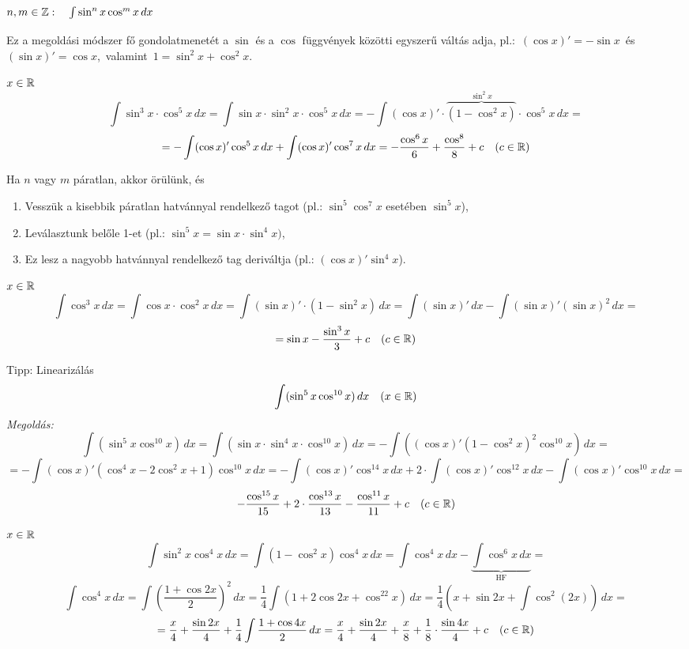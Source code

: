 \documentclass[a4paper,11.5pt]{article}
\begin{document}
	\subsubsection{$n,m\in\mathbb{Z}:\quad \int\sin^n x\cos^mx\,dx$\quad {}\quad}
	\begin{note}
		Ez a megoldási módszer fő gondolatmenetét a $\sin$ és a $\cos$ függvények közötti egyszerű váltás adja, pl.:\, $(\cos x)'=-\sin x$ \,és\, $(\sin x)'=\cos x$, \,valamint \,$1=\sin^2x + \cos^2x$.
	\end{note}
	\begin{task}$x\in\mathbb{R}$
		\[ \int \sin^3x\cdot\cos^5x\,dx=\int\sin x\cdot\sin^2x\cdot\cos^5x\,dx=-\int(\cos x)'\cdot\overbrace{(1-\cos^2 x)}^{\sin^2x}\cdot\cos^5x\,dx=\]
		\[=-\int(\cos x)'\cos^5x\,dx+\int(\cos x)'\cos^7x\,dx=-\frac{\cos^6x}{6}+\frac{\cos^8}{8}+c\quad (c\in\mathbb{R}) \]
	\end{task}
	\begin{note}
		Ha $n$ vagy $m$ páratlan, akkor örülünk, és 
		\begin{enumerate}
			\item Vesszük a kisebbik páratlan hatvánnyal rendelkező tagot (pl.: $\sin^5\cos^7x$ esetében $\sin^5x$),
			\item Leválasztunk belőle 1-et (pl.: $\sin^5x = \sin x\cdot\sin^4 x)$,
			\item Ez lesz a nagyobb hatvánnyal rendelkező tag deriváltja (pl.: $(\cos x)'\sin^4 x$).
		\end{enumerate}
		
	\end{note}
	\begin{task}$x\in\mathbb{R}$
		\[ \int\cos^3x\,dx=\int\cos x\cdot\cos^2x\,dx=\int(\sin x)'\cdot(1-\sin^2x)\,dx=\int(\sin x)'\,dx-\int(\sin x)'(\sin x)^2\,dx=\]
		\[=\sin x-\frac{\sin^3x}{3}+c\quad (c\in\mathbb{R}) \]
	\end{task}
	\begin{exercise} Tipp: Linearizálás 
		\[ \int(\sin^5x\cos^{10}x)\,dx\quad (x\in\mathbb{R}) \]
		\textit{Megoldás:}
		\[ \int(\sin^5x\cos^{10}x)\,dx=\int(\sin x\cdot\sin^4x\cdot\cos^{10}x)\,dx=-\int\left((\cos x)'(1-\cos^2x)^2\cos^{10}x\right)\,dx=\]
		\[=-\int(\cos x)'(\cos^4x-2\cos^2x+1)\cos^{10}x\,dx=-\int(\cos x)'\cos^{14}x\,dx+2\cdot\int(\cos x)'\cos^{12}x\,dx-\int(\cos x)'\cos^{10}x\,dx= \]
		\[ -\frac{\cos^{15}x}{15}+2\cdot\frac{\cos^{13}x}{13}-\frac{\cos^{11}x}{11}+c\quad (c\in\mathbb{R}) \]
	\end{exercise}
	\begin{task}$x\in\mathbb{R}$
		\[ \int\sin^2x\cos^4x\,dx=\int(1-\cos^2x)\cos^4 x\,dx=\int\cos^4 x\,dx-\underbrace{\int\cos^6x\,dx}_{\text{HF}}=\]
		\[\int\cos^4x\,dx=\int\left(\frac{1+\cos2x}{2}\right)^2\,dx=\frac{1}{4}\int(1+2\cos2x+\cos^22x)\,dx=\frac{1}{4}\left(x+\sin2x+\int\cos^2(2x)\right)\,dx=\]
		\[=\frac{x}{4}+\frac{\sin2x}{4}+\frac{1}{4}\int\frac{1+\cos4x}{2}\,dx=\frac{x}{4}+\frac{\sin2x}{4}+\frac{x}{8}+\frac{1}{8}\cdot\frac{\sin4x}{4}+c\quad (c\in\mathbb{R}) \]
		\begin{center}
			\\
		\end{center}
	\end{task}
\end{document}
